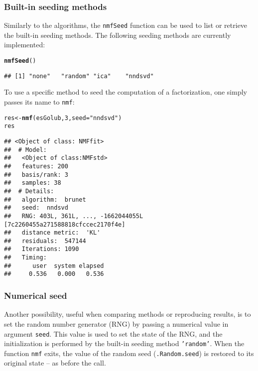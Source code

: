 \documentclass[a4paper]{article}\usepackage{graphicx, color}
\makeatletter
\newcommand{\hlfunctioncall}[1]{\textcolor[rgb]{0.501960784313725,0,0.329411764705882}{\textbf{#1}}}%
\newcommand{\hlstring}[1]{\textcolor[rgb]{0.6,0.6,1}{#1}}%
\newenvironment{kframe}{%
 \def\at@end@of@kframe{}%
 \ifinner\ifhmode%
  \def\at@end@of@kframe{\end{minipage}}%
  \begin{minipage}{\columnwidth}%
 \fi\fi%
 \def\FrameCommand##1{\hskip\@totalleftmargin \hskip-\fboxsep
 \colorbox{shadecolor}{##1}\hskip-\fboxsep
     \hskip-\linewidth \hskip-\@totalleftmargin \hskip\columnwidth}%
 \MakeFramed {\advance\hsize-\width
   \@totalleftmargin\z@ \linewidth\hsize
   \@setminipage}}%
 {\par\unskip\endMakeFramed%
 \at@end@of@kframe}
\newenvironment{knitrout}{}{} %
\let\code=\texttt
\makeatother
\begin{document}
\subsubsection{Built-in seeding methods}
Similarly to the algorithms, the \code{nmfSeed} function can be used to list or retrieve the built-in seeding methods.
The following seeding methods are currently implemented:

\begin{knitrout}
\color{fgcolor}\begin{kframe}
\begin{alltt}
\hlfunctioncall{nmfSeed}()
\end{alltt}
\begin{verbatim}
## [1] "none"   "random" "ica"    "nndsvd"
\end{verbatim}
\end{kframe}
\end{knitrout}


To use a specific method to seed the computation of a factorization, one simply passes its name to \code{nmf}:

\begin{knitrout}
\color{fgcolor}\begin{kframe}
\begin{alltt}
res <- \hlfunctioncall{nmf}(esGolub, 3, seed = \hlstring{"nndsvd"})
res
\end{alltt}
\begin{verbatim}
## <Object of class: NMFfit>
##  # Model:
##   <Object of class:NMFstd>
##   features: 200 
##   basis/rank: 3 
##   samples: 38 
##  # Details:
##   algorithm:  brunet 
##   seed:  nndsvd 
##   RNG: 403L, 361L, ..., -1662044055L [7c2260455a271588818cfccec2170f4e]
##   distance metric:  'KL' 
##   residuals:  547144 
##   Iterations: 1090 
##   Timing:
##      user  system elapsed 
##     0.536   0.000   0.536
\end{verbatim}
\end{kframe}
\end{knitrout}


\subsubsection{Numerical seed}\label{sec:numseed}
Another possibility, useful when comparing methods or reproducing results, is to set the random number generator (RNG) by passing a numerical value in argument \code{seed}.
This value is used to set the state of the RNG, and the initialization is performed by the built-in seeding method \code{'random'}.
When the function \code{nmf} exits, the value of the random seed (\code{.Random.seed}) is restored to its original state -- as before the call.
\end{document}
